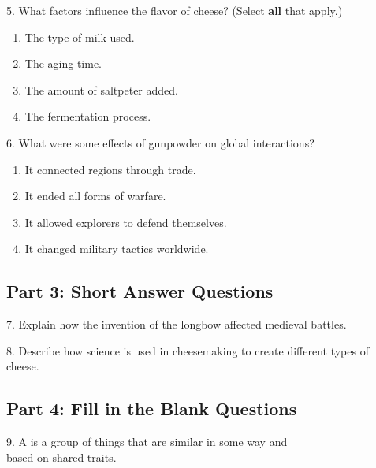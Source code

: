 \documentclass[12pt]{article}
\begin{document}
\vspace{1cm}

5. What factors influence the flavor of cheese? (Select \textbf{all} that apply.)\\
\begin{enumerate}[label=\Alph*.]
    \item The type of milk used.  
    \item The aging time.  
    \item The amount of saltpeter added.  
    \item The fermentation process.  
\end{enumerate}

\vspace{1cm}

6. What were some effects of gunpowder on global interactions?\\
\begin{enumerate}[label=\Alph*.]
    \item It connected regions through trade.  
    \item It ended all forms of warfare.  
    \item It allowed explorers to defend themselves.  
    \item It changed military tactics worldwide.  
\end{enumerate}

\vspace{1cm}

\subsection*{Part 3: Short Answer Questions}

7. Explain how the invention of the longbow affected medieval battles.\\
\vspace{3cm}

8. Describe how science is used in cheesemaking to create different types of cheese.\\
\vspace{3cm}

\subsection*{Part 4: Fill in the Blank Questions}

9. A \underline{\hspace{4cm}} is a group of things that are similar in some way and \\based on shared traits.\\
\vspace{2cm}
\end{document}
